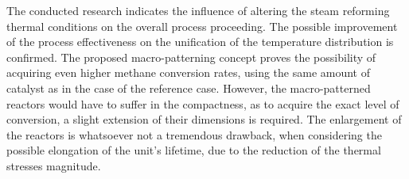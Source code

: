 \documentclass[preprint,12pt]{elsarticle}
\begin{document}
The conducted research indicates the influence of altering the steam reforming thermal conditions on the overall process proceeding. The possible improvement of the process effectiveness on the unification of the temperature distribution is confirmed. The proposed macro-patterning concept proves the possibility of acquiring even higher methane conversion rates, using the same amount of catalyst as in the case of the reference case. However, the macro-patterned reactors would have to suffer in the compactness, as to acquire the exact level of conversion, a slight extension of their dimensions is required. The enlargement of the reactors is whatsoever not a tremendous drawback, when considering the possible elongation of the unit's lifetime, due to the reduction of the thermal stresses magnitude. 

\clearpage

 





\end{document}
